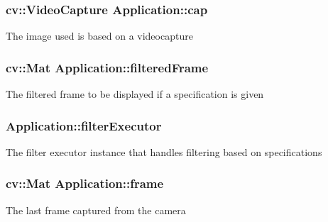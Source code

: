 \subsubsection[{\texorpdfstring{cap}{cap}}]{\setlength{\rightskip}{0pt plus 5cm}cv\+::\+Video\+Capture Application\+::cap\hspace{0.3cm}{\ttfamily [protected]}}\hypertarget{classApplication_acb0907e73dc0c973aebcf66e34b8034b}{}\label{classApplication_acb0907e73dc0c973aebcf66e34b8034b}
The image used is based on a videocapture 
\subsubsection[{\texorpdfstring{filtered\+Frame}{filteredFrame}}]{\setlength{\rightskip}{0pt plus 5cm}cv\+::\+Mat Application\+::filtered\+Frame\hspace{0.3cm}{\ttfamily [protected]}}\hypertarget{classApplication_a144fb1278bc5e80882b0bd75f077289c}{}\label{classApplication_a144fb1278bc5e80882b0bd75f077289c}
The filtered frame to be displayed if a specification is given 
\subsubsection[{\texorpdfstring{filter\+Executor}{filterExecutor}}]{ Application\+::filter\+Executor\hspace{0.3cm}{\ttfamily [protected]}}\hypertarget{classApplication_a8c2095659954e5914e8be3669264ca61}{}\label{classApplication_a8c2095659954e5914e8be3669264ca61}
The filter executor instance that handles filtering based on specifications 
\subsubsection[{\texorpdfstring{frame}{frame}}]{\setlength{\rightskip}{0pt plus 5cm}cv\+::\+Mat Application\+::frame\hspace{0.3cm}{\ttfamily [protected]}}\hypertarget{classApplication_ab33d5d3c05c0077079ed1c9cb66e1775}{}\label{classApplication_ab33d5d3c05c0077079ed1c9cb66e1775}
The last frame captured from the camera 
